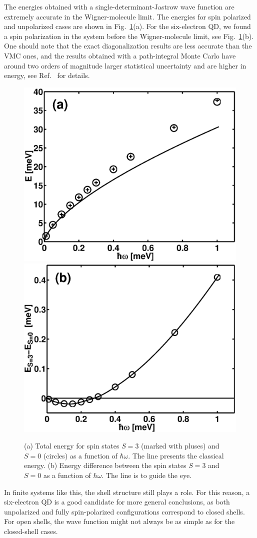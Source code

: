 \documentclass{article}
\begin{document}
The energies obtained with a single-determinant-Jastrow wave function
are extremely accurate in the Wigner-molecule limit\cite{Wigner}. The
energies for spin polarized and unpolarized cases are shown in
Fig.~\ref{WC0}(a). For the six-electron QD, we found a spin
polarization in the system before the Wigner-molecule limit, see
Fig.~\ref{WC0}(b). One should note that the exact diagonalization
results are less accurate than the VMC ones, and the results obtained
with a path-integral Monte Carlo have around two orders of magnitude
larger statistical uncertainty and are higher in energy, see
Ref.~ for details.
%
\begin{figure}[hbt]
\begin{center}
  \includegraphics[width=0.49\columnwidth]{Fig1}
  \includegraphics[width=0.49\columnwidth]{Fig2}
\end{center}
\caption{(a) Total energy for spin states $S=3$ (marked with pluses)
and $S=0$ (circles) as a function of $\hbar \omega$. The line presents
the classical energy. (b) Energy difference between the spin states
$S=3$ and $S=0$ as a function of $\hbar \omega$. The line is to guide
the eye.}
\label{WC0}
\end{figure}
%
In finite systems like this, the
shell structure still plays a role. For this reason, a six-electron QD is a
good candidate for more general conclusions, as both unpolarized and fully
spin-polarized configurations correspond to closed shells. For open shells,
the wave function might not always be as simple as for the closed-shell
cases\cite{Wigner}.
\end{document}
